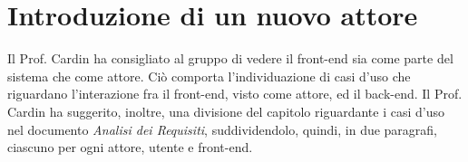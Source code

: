 \section{Introduzione di un nuovo attore}
Il Prof. Cardin ha consigliato al gruppo di vedere il front-end sia come parte del sistema che come attore. Ciò comporta l'individuazione di casi d'uso che riguardano l'interazione fra il front-end, visto come attore, ed il back-end. Il Prof. Cardin ha suggerito, inoltre, una divisione del capitolo riguardante i casi d'uso nel documento \textit{Analisi dei Requisiti}, suddividendolo, quindi, in due paragrafi, ciascuno per ogni attore, utente e front-end. 